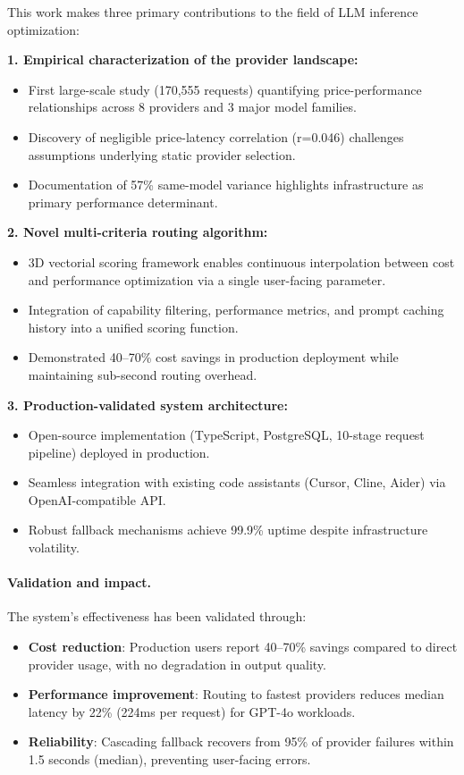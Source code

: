 \documentclass[english]{article}
\begin{document}
This work makes three primary contributions to the field of LLM inference optimization:

\textbf{1. Empirical characterization of the provider landscape:}
\begin{itemize}
    \item First large-scale study (170,555 requests) quantifying price-performance relationships across 8 providers and 3 major model families.
    \item Discovery of negligible price-latency correlation (r=0.046) challenges assumptions underlying static provider selection.
    \item Documentation of 57\% same-model variance highlights infrastructure as primary performance determinant.
\end{itemize}

\textbf{2. Novel multi-criteria routing algorithm:}
\begin{itemize}
    \item 3D vectorial scoring framework enables continuous interpolation between cost and performance optimization via a single user-facing parameter.
    \item Integration of capability filtering, performance metrics, and prompt caching history into a unified scoring function.
    \item Demonstrated 40--70\% cost savings in production deployment while maintaining sub-second routing overhead.
\end{itemize}

\textbf{3. Production-validated system architecture:}
\begin{itemize}
    \item Open-source implementation (TypeScript, PostgreSQL, 10-stage request pipeline) deployed in production.
    \item Seamless integration with existing code assistants (Cursor, Cline, Aider) via OpenAI-compatible API.
    \item Robust fallback mechanisms achieve 99.9\% uptime despite infrastructure volatility.
\end{itemize}

\paragraph{Validation and impact.}

The system's effectiveness has been validated through:
\begin{itemize}
    \item \textbf{Cost reduction}: Production users report 40--70\% savings compared to direct provider usage, with no degradation in output quality.
    \item \textbf{Performance improvement}: Routing to fastest providers reduces median latency by 22\% (224ms per request) for GPT-4o workloads.
    \item \textbf{Reliability}: Cascading fallback recovers from 95\% of provider failures within 1.5 seconds (median), preventing user-facing errors.
\end{itemize}
\end{document}
